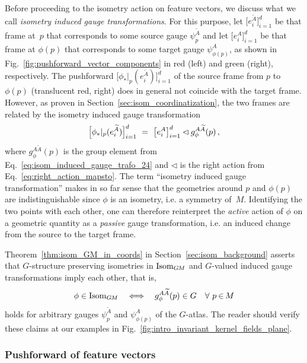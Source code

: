 Before proceeding to the isometry action on feature vectors, we discuss what we call \emph{isometry induced gauge transformations}.
For this purpose, let $\big[e_i^{\widetilde{A}} \big]_{i=1}^d$ be that frame at~$p$ that corresponds to some source gauge $\psi_p^{\widetilde{A}}$ and let $\big[e_i^A \big]_{i=1}^d$ be that frame at $\phi(p)$ that corresponds to some target gauge $\psi_{\phi(p)}^A$, as shown in Fig.~\ref{fig:pushforward_vector_components} in red (left) and green (right), respectively.
The pushforward $\big[\phi_*|_p( e_i^{\widetilde{A}}) \big]_{i=1}^d$ of the source frame from $p$ to $\phi(p)$ (translucent red, right) does in general not coincide with the target frame.
However, as proven in Section~\ref{sec:isom_coordinatization}, the two frames are related by the isometry induced gauge transformation
\begin{align}
    \pig[\phi_*|_p( e_i^{\widetilde{A}}) \pig] \raisebox{-2.5pt}{$\rule{0pt}{12pt}_{i=1}^d$}
    \ =\ \big[e_i^A \big]_{i=1}^d \lhd g_\phi^{A\widetilde{A}}(p) \,,
\end{align}
where $g_\phi^{A\widetilde{A}}(p)$ is the group element from Eq.~\eqref{eq:isom_induced_gauge_trafo_24} and $\lhd$ is the right action from Eq.~\eqref{eq:right_action_mapsto}.
The term ``isometry induced gauge transformation'' makes in so far sense that the geometries around $p$ and $\phi(p)$ are indistinguishable since $\phi$ is an isometry, i.e. a symmetry of~$M$.
Identifying the two points with each other, one can therefore reinterpret the \emph{active} action of $\phi$ on a geometric quantity as a \emph{passive} gauge transformation, i.e. an induced change from the source to the target frame.


Theorem~\ref{thm:isom_GM_in_coords} in Section~\ref{sec:isom_background} asserts that $G$-structure preserving isometries in $\operatorname{Isom}_{G\mkern-1.4muM}$ and $G$-valued induced gauge transformations imply each other, that is,
\begin{align}\label{eq:IsomGM_coord_in_G_24}
    \phi \in \operatorname{Isom}_{G\mkern-1.4muM} \quad \Longleftrightarrow \quad g_\phi^{A\widetilde{A}}(p) \in G\ \ \ \forall\ p \mkern-1mu\in\mkern-2mu M
\end{align}
holds for arbitrary gauges $\psi_p^{\widetilde{A}}$ and $\psi_{\phi(p)}^A$ of the $G$-atlas.
The reader should verify these claims at our examples in Fig.~\ref{fig:intro_invariant_kernel_fields_plane}.






\subsubsection{Pushforward of feature vectors}

